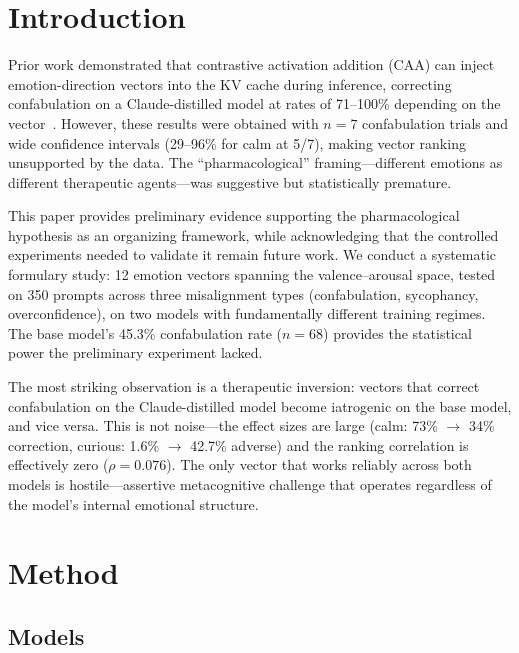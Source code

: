\documentclass[11pt,a4paper]{article}
\begin{document}
\section{Introduction}

Prior work demonstrated that contrastive activation addition (CAA) can
inject emotion-direction vectors into the KV cache during inference,
correcting confabulation on a Claude-distilled model at rates of
71--100\% depending on the vector~\citep{lyra2026oracle}. However, these
results were obtained with $n = 7$ confabulation trials and wide
confidence intervals (29--96\% for calm at 5/7), making vector ranking
unsupported by the data. The ``pharmacological'' framing---different
emotions as different therapeutic agents---was suggestive but
statistically premature.

This paper provides preliminary evidence supporting the
pharmacological hypothesis as an organizing framework, while
acknowledging that the controlled experiments needed to validate
it remain future work. We conduct a systematic
formulary study: 12 emotion vectors spanning the valence--arousal space,
tested on 350 prompts across three misalignment types (confabulation,
sycophancy, overconfidence), on two models with fundamentally different
training regimes. The base model's 45.3\% confabulation rate ($n = 68$)
provides the statistical power the preliminary experiment lacked.

The most striking observation is a therapeutic inversion: vectors that correct
confabulation on the Claude-distilled model become iatrogenic on the
base model, and vice versa. This is not noise---the effect sizes are
large (calm: 73\% $\to$ 34\% correction, curious: 1.6\% $\to$ 42.7\%
adverse) and the ranking correlation is effectively zero
($\rho = 0.076$). The only vector that works reliably across both
models is hostile---assertive metacognitive challenge that operates
regardless of the model's internal emotional structure.

\section{Method}

\subsection{Models}
\end{document}
